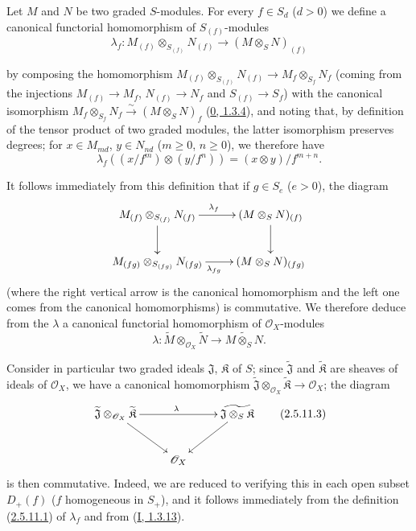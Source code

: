 \begin{env}[2.5.11]
\label{II.2.5.11}
Let $M$ and $N$ be two graded $S$-modules. For every $f\in S_d$ ($d>0$)
we define a canonical functorial homomorphism of $S_{(f)}$-modules
\[
\label{II.2.5.11.1}
  \lambda_f:M_{(f)}\otimes_{S_{(f)}}N_{(f)}
  \longrightarrow(M\otimes_S N)_{(f)}
\tag{2.5.11.1}
\]

by composing the homomorphism
$M_{(f)}\otimes_{S_{(f)}}N_{(f)}\to M_f\otimes_{S_f}N_f$
(coming from the injections $M_{(f)}\to M_f$, $N_{(f)}\to N_f$ and
$S_{(f)}\to S_f$) with the canonical isomorphism
$M_f\otimes_{S_f}N_f\xrightarrow{\sim}(M\otimes_S N)_f$
(\hyperref[0.1.3.4]{0, 1.3.4}), and noting that, by definition of the
tensor product of two graded modules, the latter isomorphism preserves
degrees; for $x\in M_{md}$, $y\in N_{nd}$ ($m\geq0$, $n\geq0$), we
therefore have
\[
  \lambda_f((x/f^m)\otimes(y/f^n))=(x\otimes y)/f^{m+n}.
\]

It follows immediately from this definition that if $g\in S_e$ ($e>0$), the
diagram
\[
  \xymatrix{
    M_{(f)}\otimes_{S_{(f)}}N_{(f)}\ar[r]^{\lambda_f}\ar[d]
    & (M\otimes_S N)_{(f)}\ar[d]\\
    M_{(fg)}\otimes_{S_{(fg)}}N_{(fg)}\ar[r]_{\lambda_{fg}}
    & (M\otimes_S N)_{(fg)}
  }
\]
(where the right vertical arrow is the canonical homomorphism and the left
one comes from the canonical homomorphisms) is commutative. We therefore
deduce from the $\lambda$ a canonical functorial homomorphism of
$\mathcal{O}_X$-modules
\[
\label{II.2.5.11.2}
  \lambda:\widetilde{M}\otimes_{\mathcal{O}_X}\widetilde{N}
  \longrightarrow\widetilde{M\otimes_S N}.
\tag{2.5.11.2}
\]

Consider in particular two graded ideals $\mathfrak{J}$,
$\mathfrak{K}$ of $S$; since $\widetilde{\mathfrak{J}}$ and
$\widetilde{\mathfrak{K}}$ are sheaves of ideals of
$\mathcal{O}_X$, we have a canonical homomorphism
$\widetilde{\mathfrak{J}}\otimes_{\mathcal{O}_X}
\widetilde{\mathfrak{K}}\to\mathcal{O}_X$; the diagram
\[
\label{II.2.5.11.3}
  \xymatrix{
    \widetilde{\mathfrak{J}}\otimes_{\mathcal{O}_X}
    \widetilde{\mathfrak{K}}\ar[rr]^\lambda\ar[dr]
    && \widetilde{\mathfrak{J}\otimes_S\mathfrak{K}}\ar[dl]\\
    & \mathcal{O}_X &
  }
\tag{2.5.11.3}
\]
is then commutative. Indeed, we are reduced to verifying this in each
open subset $D_+(f)$ ($f$ homogeneous in $S_+$), and it follows immediately
from the definition (\hyperref[II.2.5.11.1]{2.5.11.1}) of $\lambda_f$ and
from (\hyperref[I.1.3.13]{I, 1.3.13}).


\end{env}
